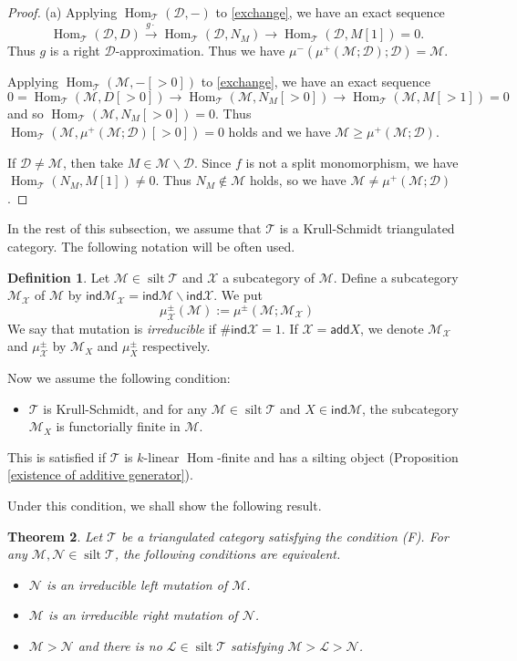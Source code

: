 \documentclass[a4paper,reqno]{amsart}
\newtheorem{theorem}{Theorem}[section]
\theoremstyle{definition}
\newtheorem{definition}[theorem]{Definition}
\newcommand{\DD}{{\mathcal D}}
\newcommand{\TT}{{\mathcal T}}
\newcommand{\MM}{{\mathcal M}}
\newcommand{\NN}{{\mathcal N}}
\newcommand{\LL}{{\mathcal L}}
\newcommand{\XX}{{\mathcal X}}
\newcommand{\ind}{\mathsf{ind}}
\newcommand{\add}{\mathsf{add}}
\newcommand{\Hom}{\operatorname{Hom}\nolimits}
\newcommand{\silt}{\operatorname{silt}\nolimits}
\begin{document}
\begin{proof}
(a) Applying $\Hom_{\TT}(\DD,-)$ to \eqref{exchange}, we have an exact sequence
\[\Hom_{\TT}(\DD,D)\stackrel{g\cdot}{\to}\Hom_{\TT}(\DD,N_M)\to\Hom_{\TT}(\DD,M[1])=0.\]
Thus $g$ is a right $\DD$-approximation.
Thus we have $\mu^-(\mu^+(\MM;\DD);\DD)=\MM$.

Applying $\Hom_{\TT}(\MM,-[>0])$ to \eqref{exchange}, we have an exact sequence
\[0=\Hom_{\TT}(\MM,D[>0])\to\Hom_{\TT}(\MM,N_M[>0])\to\Hom_{\TT}(\MM,M[>1])=0\]
and so $\Hom_{\TT}(\MM,N_M[>0])=0$.
Thus $\Hom_{\TT}(\MM,\mu^+(\MM;\DD)[>0])=0$ holds and we have $\MM\ge\mu^+(\MM;\DD)$.

If $\DD\neq\MM$, then take $M\in\MM\backslash\DD$.
Since $f$ is not a split monomorphism, we have $\Hom_{\TT}(N_M,M[1])\neq0$.
Thus $N_M\notin\MM$ holds, so we have $\MM\neq\mu^+(\MM;\DD)$.
\end{proof}

In the rest of this subsection, we assume that $\TT$ is a Krull-Schmidt triangulated category.
The following notation will be often used.

\begin{definition}
Let $\MM\in\silt\TT$ and $\XX$ a subcategory of $\MM$.
Define a subcategory $\MM_{\XX}$ of $\MM$ by $\ind\MM_{\XX}=\ind\MM\backslash\ind\XX$.
We put
\[\mu^{\pm}_{\XX}(\MM):=\mu^{\pm}(\MM;\MM_{\XX})\]
We say that mutation is \emph{irreducible} if $\#\ind\XX=1$.
If $\XX=\add X$, we denote $\MM_{\XX}$ and $\mu_{\XX}^\pm$ by $\MM_X$ and $\mu_X^\pm$ respectively.
\end{definition}

Now we assume the following condition:
\begin{itemize}
\item[(F)] $\TT$ is Krull-Schmidt, and for any $\MM\in\silt\TT$ and $X\in\ind\MM$, the subcategory $\MM_X$ is functorially finite in $\MM$.
\end{itemize}
This is satisfied if $\TT$ is $k$-linear $\Hom$-finite and has a silting object (Proposition \ref{existence of additive generator}).

Under this condition, we shall show the following result.

\begin{theorem}\label{two quivers}
Let $\TT$ be a triangulated category satisfying the condition (F).
For any $\MM,\NN\in\silt\TT$, the following conditions are equivalent.
\begin{itemize}
\item[(a)] $\NN$ is an irreducible left mutation of $\MM$.
\item[(b)] $\MM$ is an irreducible right mutation of $\NN$.
\item[(c)] $\MM>\NN$ and there is no $\LL\in\silt\TT$ satisfying $\MM>\LL>\NN$.
\end{itemize}
\end{theorem}
\end{document}

